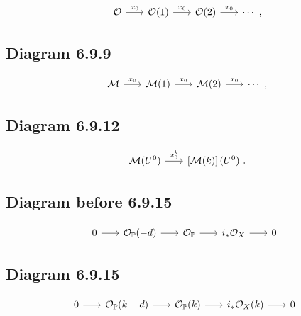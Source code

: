 \documentclass[leqno]{amsart}
\begin{document}
	\begin{equation*}
		\begin{tikzcd}[sep=scriptsize]
			\mathcal{O} \arrow{r}{x_0} & \mathcal{O}(1) \arrow{r}{x_0} & \mathcal{O}(2) \arrow{r}{x_0} & \cdots \rlap{\  ,}
		\end{tikzcd}
	\end{equation*}

	\subsection*{Diagram 6.9.9}

	\begin{equation*}
		\begin{tikzcd}[sep=scriptsize]
			\mathcal{M} \arrow{r}{x_0} & \mathcal{M}(1) \arrow{r}{x_0} & \mathcal{M}(2) \arrow{r}{x_0} & \cdots \rlap{\  ,}
		\end{tikzcd}
	\end{equation*}

	\subsection*{Diagram 6.9.12}

	\begin{equation*}
		\begin{tikzcd}[sep=scriptsize]
			\mathcal{M}(U^0) \arrow{r}{x_{0}^{k}} & \left[\mathcal{M}(k)\right](U^0) \rlap{\  .}
		\end{tikzcd}
	\end{equation*}

	\subsection*{Diagram before 6.9.15}

	\begin{equation*}
		\begin{tikzcd}[sep=scriptsize]
			0 \arrow{r} & \mathcal{O}_{\mathbb{P}}(-d) \arrow{r} & \mathcal{O}_{\mathbb{P}} \arrow{r} & i_{\ast} \mathcal{O}_{X} \arrow{r} & 0
		\end{tikzcd}
	\end{equation*}

	\subsection*{Diagram 6.9.15}

	\begin{equation*}
		\begin{tikzcd}[sep=scriptsize]
			0 \arrow{r} & \mathcal{O}_{\mathbb{P}}(k-d) \arrow{r} & \mathcal{O}_{\mathbb{P}}(k) \arrow{r} & i_{\ast} \mathcal{O}_{X}(k) \arrow{r} & 0
		\end{tikzcd}
	\end{equation*}
\end{document}
